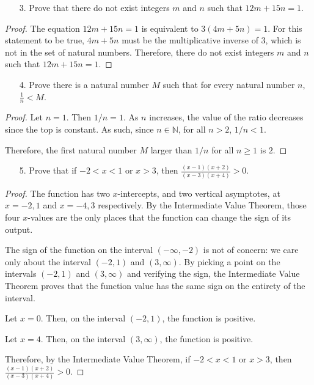 \documentclass[10pt]{article}
\theoremstyle{definition}
\theoremstyle{plain}
\newcommand{\N}{\mathbb{N}}
\begin{document}
\begin{enumerate}
\item[3.] Prove that there do not exist integers $m$ and $n$ such that $12m + 15n = 1$.
\end{enumerate}

\begin{proof}
  The equation $12m + 15n = 1$ is equivalent to $3(4m+5n)=1$. For this statement to be true, $4m+5n$ must be the multiplicative inverse of $3$, which is not in the set of natural numbers. Therefore, there do not exist integers $m$ and $n$ such that $12m + 15n = 1$.
\end{proof}

\begin{enumerate}
\item[4.] Prove there is a natural number $M$ such that for every natural number $n$, $\frac{1}{n} < M$.
\end{enumerate}

\begin{proof}
  Let $n=1$. Then $1/n=1$. As $n$ increases, the value of the ratio decreases since the top is constant. As such, since $n\in\N$, for all $n>2$, $1/n < 1$.

  \par Therefore, the first natural number $M$ larger than $1/n$ for all $n\geq 1$ is $2$.
\end{proof}

\begin{enumerate}
\item[5.] Prove that if $-2 < x < 1$ or $x > 3$, then $\frac{(x-1)(x+2)}{(x-3)(x+4)} > 0$.
\end{enumerate}

\begin{proof}
  The function has two $x$-intercepts, and two vertical asymptotes, at $x=-2,1$ and $x=-4,3$ respectively. By the Intermediate Value Theorem, those four $x$-values are the only places that the function can change the sign of its output.

  \par The sign of the function on the interval $(-\infty, -2)$ is not of concern: we care only about the interval $(-2,1)$ and $(3,\infty)$. By picking a point on the intervals $(-2,1)$ and $(3,\infty)$ and verifying the sign, the Intermediate Value Theorem proves that the function value has the same sign on the entirety of the interval.

  \par Let $x=0$. Then, on the interval $(-2,1)$, the function is positive.

  \par Let $x=4$. Then, on the interval $(3,\infty)$, the function is positive.

  \par Therefore, by the Intermediate Value Theorem, if $-2 < x < 1$ or $x > 3$, then $\frac{(x-1)(x+2)}{(x-3)(x+4)} > 0$.
\end{proof}
\end{document}
